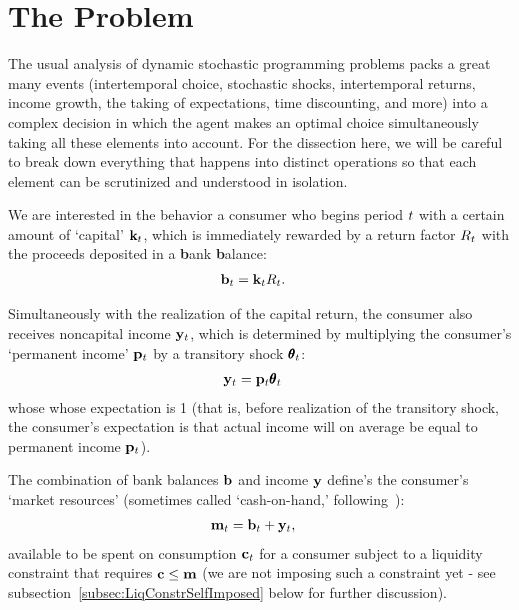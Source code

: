
\hypertarget{the-problem}{}
\section{The Problem}\label{sec:the-problem}

The usual analysis of dynamic stochastic programming problems packs a great many events (intertemporal choice, stochastic shocks, intertemporal returns, income growth, the taking of expectations, time discounting, and more) into a complex decision in which the agent makes an optimal choice simultaneously taking all these elements into account. For the dissection here, we will be careful to break down everything that happens into distinct operations so that each element can be scrutinized and understood in isolation.

We are interested in the behavior a consumer who begins {period} $t$ with a certain amount of `capital' $\mathbf{k}_{t}$, which is immediately rewarded by a return factor $R_{t}$  with the proceeds deposited in a \textbf{b}ank \textbf{b}alance:
\begin{equation}\begin{gathered}\begin{aligned}\label{eq:bLvl}
      \mathbf{b}_{t} & = \mathbf{k}_{t}R_{t}. 
    \end{aligned}\end{gathered}\end{equation}

Simultaneously with the realization of the capital return, the consumer also receives noncapital income $\mathbf{y}_{t}$, which is determined by multiplying the consumer's `permanent income' $\mathbf{p}_{t}$ by a transitory shock $\pmb{\theta}_{t}$:
\begin{equation}\begin{gathered}\begin{aligned}
      \mathbf{y}_{t} & = \mathbf{p}_{t}\pmb{\theta}_{t} \label{eq:yLvl}
    \end{aligned}\end{gathered}\end{equation}
whose whose expectation is 1 (that is, before realization of the transitory shock, the consumer's expectation is that actual income will on average be equal to permanent income $\mathbf{p}_{t}$).

The combination of bank balances $\mathbf{b}$ and income $\mathbf{y}$ define's the consumer's `market resources' (sometimes called `cash-on-hand,' following~\cite{deatonUnderstandingC}):
\begin{equation}\begin{gathered}\begin{aligned}
      \mathbf{m}_{t} & = \mathbf{b}_{t}+\mathbf{y}_{t} \label{eq:mLvl},
    \end{aligned}\end{gathered}\end{equation}
available to be spent on consumption $\mathbf{c}_{t}$ for a consumer subject to a liquidity constraint that requires $\mathbf{c} \leq \mathbf{m}$ (we are not imposing such a constraint yet - see subsection~\ref{subsec:LiqConstrSelfImposed} below for further discussion).

